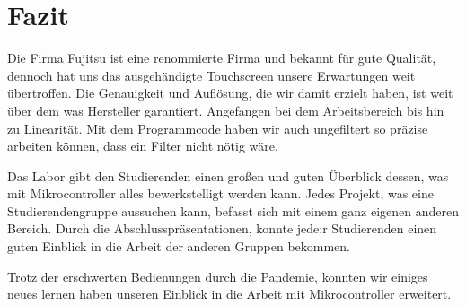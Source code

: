 \chapter{Fazit}

Die Firma Fujitsu ist eine renommierte Firma und bekannt für gute Qualität, dennoch hat uns das ausgehändigte Touchscreen unsere Erwartungen weit übertroffen. 
Die Genauigkeit und Auflösung, die wir damit erzielt haben, ist weit über dem was Hersteller garantiert.
Angefangen bei dem Arbeitsbereich bis hin zu Linearität. 
Mit dem Programmcode haben wir auch ungefiltert so präzise arbeiten können, dass ein Filter nicht nötig wäre.

Das Labor gibt den Studierenden einen großen und guten Überblick dessen, was mit Mikrocontroller alles bewerkstelligt werden kann. 
Jedes Projekt, was eine Studierendengruppe aussuchen kann, befasst sich mit einem ganz eigenen anderen Bereich. 
Durch die Abschlusspräsentationen, konnte jede:r Studierenden einen guten Einblick in die Arbeit der anderen Gruppen bekommen.

Trotz der erschwerten Bedienungen durch die Pandemie, konnten wir einiges neues lernen haben unseren Einblick in die Arbeit mit Mikrocontroller erweitert.


